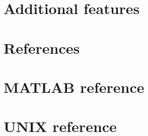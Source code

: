 \documentclass[10pt,a4paper,oneside]{book}
\begin{document}
\chapter{Additional features}
\label{chap:features}


\chapter*{References}



\appendix
%

\chapter{MATLAB reference}
\label{appendix:matlabReference}


\chapter{UNIX reference}
\label{appendix:unixReference}

\end{document}

